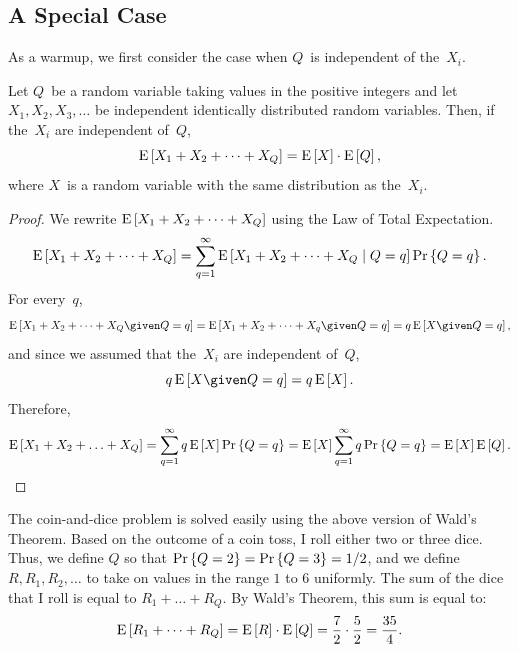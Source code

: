 \documentclass[11pt,twoside]{article}
\begin{document}
\subsection{A Special Case}

As a warmup, we first consider the case when $Q$~is independent of
the~$X_i$.
\begin{theorem}
  Let $Q$~be a random variable taking values in the positive integers
  and let $X_1, X_2, X_3, \dots$ be independent identically
  distributed random variables. Then, if the~$X_i$ are independent
  of~$Q$,
  \begin{displaymath}
    \mathop{\textup{E}}\nolimits\left[X_1 + X_2 + \cdots + X_Q\right] = \mathop{\textup{E}}\nolimits\left[X\right] \cdot \mathop{\textup{E}}\nolimits\left[Q\right],
  \end{displaymath}
  where $X$~is a random variable with the same distribution as
  the~$X_i$.
\end{theorem}
\begin{proof}
  We rewrite $\mathop{\textup{E}}\nolimits\left[X_1 + X_2 + \cdots + X_Q\right]$ using the Law of Total
  Expectation.
  \begin{displaymath}
    \mathop{\textup{E}}\nolimits\left[X_1 + X_2 + \cdots + X_Q\right]
    =
    \sum_{q=1}^{\infty} \mathop{\textup{E}}\nolimits\left[X_1 + X_2 + \cdots + X_Q\mid Q = q\right] \mathop{\textup{Pr}}\nolimits\left\{Q = q\right\}.
  \end{displaymath}
  For every~$q$,
  \begin{displaymath}
    \expect{X_1 + X_2 + \cdots + X_Q \given Q = q} = 
    \expect{X_1 + X_2 + \cdots + X_q \given Q = q} = q \expect{X \given Q = q},
  \end{displaymath}
  and since we assumed that the~$X_i$ are independent of~$Q$,
  \begin{displaymath}
     q \expect{X \given Q = q} = q \expect{X}.
  \end{displaymath}
  Therefore,
  \begin{displaymath}
    \mathop{\textup{E}}\nolimits\left[X_1 + X_2 + \ldots + X_Q\right]
    =
    \sum_{q=1}^{\infty} q \mathop{\textup{E}}\nolimits\left[X\right] \mathop{\textup{Pr}}\nolimits\left\{Q = q\right\}
    =
    \mathop{\textup{E}}\nolimits\left[X\right] \sum_{q=1}^{\infty} q \mathop{\textup{Pr}}\nolimits\left\{Q = q\right\}
    =
    \mathop{\textup{E}}\nolimits\left[X\right] \mathop{\textup{E}}\nolimits\left[Q\right].
  \end{displaymath}
\end{proof}
\begin{example}  
  \label{ex:coin-and-dice}
  The coin-and-dice problem is solved easily using the above version
  of Wald's Theorem.  Based on the outcome of a coin toss, I roll
  either two or three dice.  Thus, we define $Q$ so that $\mathop{\textup{Pr}}\nolimits\left\{Q = 2\right\} =
  \mathop{\textup{Pr}}\nolimits\left\{Q = 3\right\} = 1/2$, and we define $R, R_1, R_2, \ldots$ to
  take on values in the range $1$ to $6$ uniformly.  The sum of the
  dice that I roll is equal to $R_1 + \ldots + R_Q$.  By Wald's
  Theorem, this sum is equal to:
\[
\mathop{\textup{E}}\nolimits\left[R_1 + \cdots + R_Q\right] = \mathop{\textup{E}}\nolimits\left[R\right] \cdot \mathop{\textup{E}}\nolimits\left[Q\right]
= \frac{7}{2} \cdot \frac{5}{2} = \frac{35}{4}.
\]
\end{example}
\end{document}
